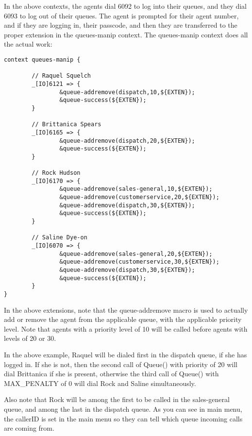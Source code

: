 In the above contexts, the agents dial 6092 to log into their queues,
and they dial 6093 to log out of their queues. The agent is prompted
for their agent number, and if they are logging in, their passcode,
and then they are transferred to the proper extension in the
queues-manip context.  The queues-manip context does all the
actual work:

\begin{astlisting}
\begin{verbatim}
context queues-manip {

        // Raquel Squelch
        _[IO]6121 => {
                &queue-addremove(dispatch,10,${EXTEN});
                &queue-success(${EXTEN});
        }

        // Brittanica Spears
        _[IO]6165 => {
                &queue-addremove(dispatch,20,${EXTEN});
                &queue-success(${EXTEN});
        }

        // Rock Hudson
        _[IO]6170 => {
                &queue-addremove(sales-general,10,${EXTEN});
                &queue-addremove(customerservice,20,${EXTEN});
                &queue-addremove(dispatch,30,${EXTEN});
                &queue-success(${EXTEN});
        }

        // Saline Dye-on
        _[IO]6070 => {
                &queue-addremove(sales-general,20,${EXTEN});
                &queue-addremove(customerservice,30,${EXTEN});
                &queue-addremove(dispatch,30,${EXTEN});
                &queue-success(${EXTEN});
        }
}
\end{verbatim}
\end{astlisting}

In the above extensions, note that the queue-addremove macro is used
to actually add or remove the agent from the applicable queue,
with the applicable priority level. Note that agents with a
priority level of 10 will be called before agents with levels
of 20 or 30.

In the above example, Raquel will be dialed first in the dispatch
queue, if she has logged in. If she is not, then the second call of
Queue() with priority of 20 will dial Brittanica if she is present,
otherwise the third call of Queue() with MAX\_PENALTY of 0 will
dial Rock and Saline simultaneously.

Also note that Rock will be among the first to be called in the sales-general
queue, and among the last in the dispatch queue. As you can see in
main menu, the callerID is set in the main menu so they can tell
which queue incoming calls are coming from.

